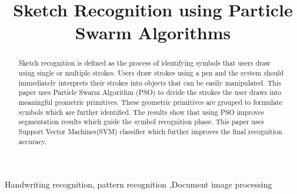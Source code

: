 \documentclass{article}%
\title{Sketch Recognition using Particle Swarm Algorithms}
\begin{document}
\maketitle
\begin{abstract}
Sketch recognition is defined as the process of identifying symbols that users draw using single or multiple strokes. Users draw strokes using a pen and the system should immediately interprets their strokes into objects that can be easily manipulated. This paper uses Particle Swarm Algorithm (PSO) to divide the strokes the user draws into meaningful geometric primitives. These geometric primitives are grouped to formulate symbols which are further identified. The results show that using PSO improves segmentation results which guide the symbol recognition phase. This paper uses Support Vector Machines(SVM) classifier which further improves the final recognition accuracy.  %
\end{abstract}
\begin{keywords}
Handwriting recognition, pattern recognition ,Document image processing
\end{keywords}
\end{document}
